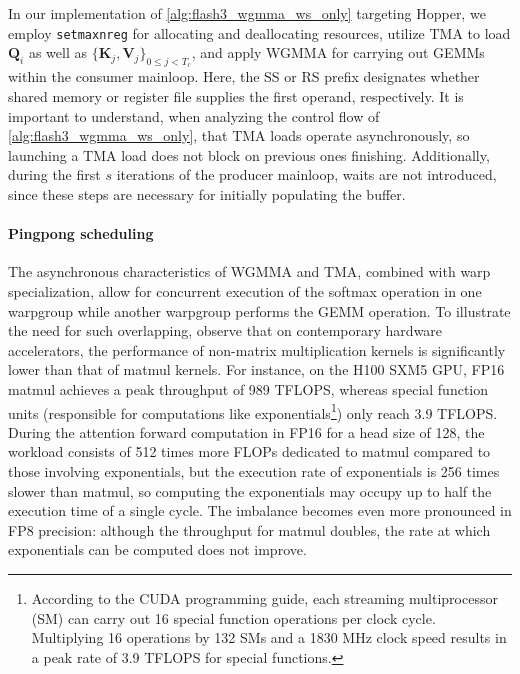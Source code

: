 In our implementation of \cref{alg:flash3_wgmma_ws_only} targeting Hopper, we employ \verb|setmaxnreg| for allocating and deallocating resources, utilize TMA to load $\mathbf{Q}_i$ as well as $\{ \mathbf{K}_j, \mathbf{V}_j \}_{0 \leq j < T_c}$, and apply WGMMA for carrying out GEMMs within the consumer mainloop. Here, the SS or RS prefix designates whether shared memory or register file supplies the first operand, respectively. It is important to understand, when analyzing the control flow of \cref{alg:flash3_wgmma_ws_only}, that TMA loads operate asynchronously, so launching a TMA load does not block on previous ones finishing. Additionally, during the first $s$ iterations of the producer mainloop, waits are not introduced, since these steps are necessary for initially populating the buffer.

\paragraph{Pingpong scheduling} The asynchronous characteristics of WGMMA and TMA, combined with warp specialization, allow for concurrent execution of the softmax operation in one warpgroup while another warpgroup performs the GEMM operation. To illustrate the need for such overlapping, observe that on contemporary hardware accelerators, the performance of non-matrix multiplication kernels is significantly lower than that of matmul kernels. For instance, on the H100 SXM5 GPU, FP16 matmul achieves a peak throughput of 989 TFLOPS, whereas special function units (responsible for computations like exponentials\footnote{According to the CUDA programming guide, each streaming multiprocessor (SM) can carry out 16 special function operations per clock cycle. Multiplying 16 operations by 132 SMs and a 1830 MHz clock speed results in a peak rate of 3.9 TFLOPS for special functions.}) only reach 3.9 TFLOPS. During the attention forward computation in FP16 for a head size of 128, the workload consists of 512 times more FLOPs dedicated to matmul compared to those involving exponentials, but the execution rate of exponentials is 256 times slower than matmul, so computing the exponentials may occupy up to half the execution time of a single cycle. The imbalance becomes even more pronounced in FP8 precision: although the throughput for matmul doubles, the rate at which exponentials can be computed does not improve.

